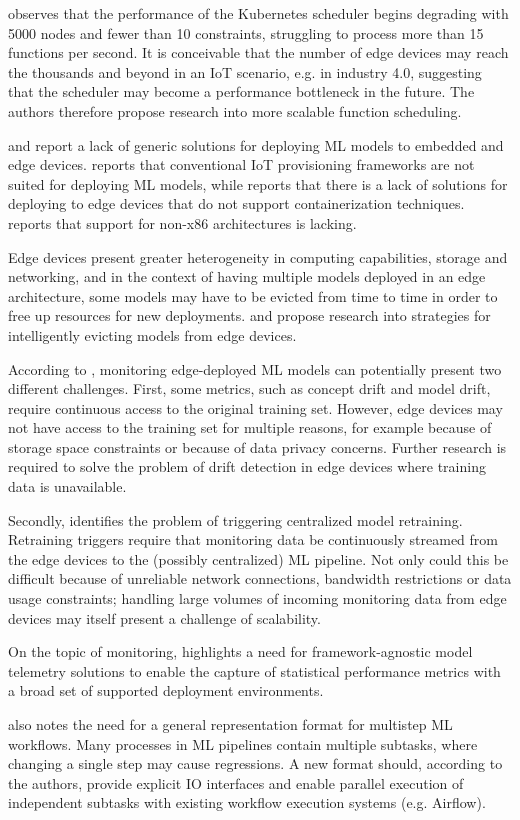 \cite{Rausch2019a} observes that the performance of the Kubernetes scheduler begins degrading with 5000 nodes and fewer than 10 constraints, struggling to process more than 15 functions per second.
It is conceivable that the number of edge devices may reach the thousands and beyond in an IoT scenario, e.g. in industry 4.0, suggesting that the scheduler may become a performance bottleneck in the future.
The authors therefore propose research into more scalable function scheduling.

\cite{Bosch2021} and \cite{Rausch2019} report a lack of generic solutions for deploying ML models to embedded and edge devices.
\cite{Rausch2019} reports that conventional IoT provisioning frameworks are not suited for deploying ML models, while \cite{Gupta2020} reports that there is a lack of solutions for deploying to edge devices that do not support containerization techniques.
\cite{Rausch2019a} reports that support for non-x86 architectures is lacking.

Edge devices present greater heterogeneity in computing capabilities, storage and networking, and in the context of having multiple models deployed in an edge architecture, some models may have to be evicted from time to time in order to free up resources for new deployments.
\cite{Rausch2019} and \cite{Rausch2019a} propose research into strategies for intelligently evicting models from edge devices.

According to \cite{Rausch2019}, monitoring edge-deployed ML models can potentially present two different challenges.
First, some metrics, such as concept drift and model drift, require continuous access to the original training set.
However, edge devices may not have access to the training set for multiple reasons, for example because of storage space constraints or because of data privacy concerns.
Further research is required to solve the problem of drift detection in edge devices where training data is unavailable.

Secondly, \cite{Rausch2019} identifies the problem of triggering centralized model retraining.
Retraining triggers require that monitoring data be continuously streamed from the edge devices to the (possibly centralized) ML pipeline.
Not only could this be difficult because of unreliable network connections, bandwidth restrictions or data usage constraints; handling large volumes of incoming monitoring data from edge devices may itself present a challenge of scalability.

On the topic of monitoring, \cite{Chen2020} highlights a need for framework-agnostic model telemetry solutions to enable the capture of statistical performance metrics with a broad set of supported deployment environments.

\cite{Chen2020} also notes the need for a general representation format for multistep ML workflows.
Many processes in ML pipelines contain multiple subtasks, where changing a single step may cause regressions.
A new format should, according to the authors, provide explicit IO interfaces and enable parallel execution of independent subtasks with existing workflow execution systems (e.g. Airflow).